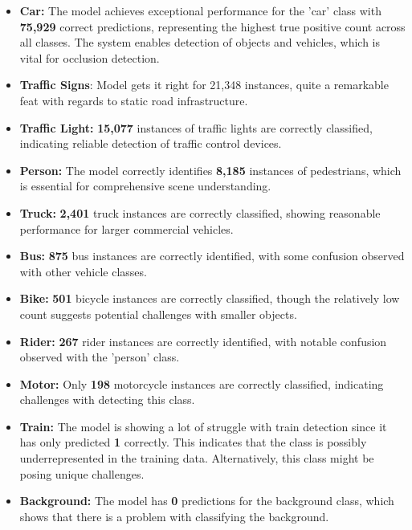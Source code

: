 \documentclass[12pt,a4paper]{report}
\theoremstyle{definition}
\theoremstyle{remark}
\begin{document}
\begin{itemize}
	\item \textbf{Car:} The model achieves exceptional performance for the 'car' class with \textbf{75,929} correct predictions, representing the highest true positive count across all classes. The system enables detection of objects and vehicles, which is vital for occlusion detection.
	
	\item \textbf{Traffic Signs}: Model gets it right for 21,348 instances, quite a remarkable feat with regards to static road infrastructure.
	
	\item \textbf{Traffic Light:} \textbf{15,077} instances of traffic lights are correctly classified, indicating reliable detection of traffic control devices.
	
	\item \textbf{Person:} The model correctly identifies \textbf{8,185} instances of pedestrians, which is essential for comprehensive scene understanding.
	
	\item \textbf{Truck:} \textbf{2,401} truck instances are correctly classified, showing reasonable performance for larger commercial vehicles.
	
	\item \textbf{Bus:} \textbf{875} bus instances are correctly identified, with some confusion observed with other vehicle classes.
	
	\item \textbf{Bike:} \textbf{501} bicycle instances are correctly classified, though the relatively low count suggests potential challenges with smaller objects.
	
	\item \textbf{Rider:} \textbf{267} rider instances are correctly identified, with notable confusion observed with the 'person' class.
	
	\item \textbf{Motor:} Only \textbf{198} motorcycle instances are correctly classified, indicating challenges with detecting this class.
	
	\item \textbf{Train:} The model is showing a lot of struggle with train detection since it has only predicted \textbf{1} correctly. This indicates that the class is possibly underrepresented in the training data. Alternatively, this class might be posing unique challenges.
	
	\item \textbf{Background:} The model has \textbf{0} predictions for the background class, which shows that there is a problem with classifying the background.
\end{itemize}
\end{document}
